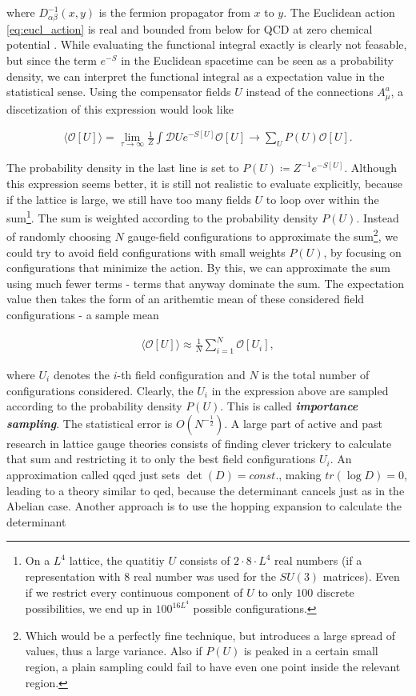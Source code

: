 \documentclass{article}
\theoremstyle{plain} %
\theoremstyle{convention} %
\theoremstyle{remark} %
\def\df#1{\textbf{\textit{#1}}}
\numberwithin{equation}{section}
\begin{document}
where $D_{\alpha \beta}^{-1}(x,y)$ is the fermion propagator from $x$ to $y$. The Euclidean action \eqref{eq:eucl_action} is real and bounded from below for QCD at zero chemical potential \cite{gupta1998}. While evaluating the functional integral exactly is clearly not feasable, but since the term $e^{-S}$ in the Euclidean spacetime can be seen as a probability density, we can interpret the functional integral as a expectation value in the statistical sense. Using the compensator fields $U$ instead of the connections $A_{\mu}^a$, a discetization of this expression would look like

\begin{align*}
    \langle \mathcal{O}[U] \rangle = \lim_{\tau \to \infty} \frac{1}{Z} \int \mathcal{D} U e^{-S[U]} \mathcal{O}[U] \longrightarrow \sum_U P(U) \mathcal{O}[U].
\end{align*}

The probability density in the last line is set to $P(U) \coloneqq Z^{-1} e^{-S[U]}$. Although this expression seems better, it is still not realistic to evaluate explicitly, because if the lattice is large, we still have too many fields $U$ to loop over within the sum\footnote{On a $L^4$ lattice, the quatitiy $U$ consists of $2 \cdot 8 \cdot L^4$ real numbers (if a representation with $8$ real number was used for the $SU(3)$ matrices). Even if we restrict every continuous component of $U$ to only $100$ discrete possibilities, we end up in $100^{16 L^4}$ possible configurations.}. The sum is weighted according to the probability density $P(U)$. Instead of randomly choosing $N$ gauge-field configurations to approximate the sum\footnote{Which would be a perfectly fine technique, but introduces a large spread of values, thus a large variance. Also if $P(U)$ is peaked in a certain small region, a plain sampling could fail to have even one point inside the relevant region.}, we could try to avoid field configurations with small weights $P(U)$, by focusing on configurations that minimize the action. By this, we can approximate the sum using much fewer terms - terms that anyway dominate the sum. The expectation value then takes the form of an arithemtic mean of these considered field configurations - a sample mean

\begin{align}
    \langle \mathcal{O}[U] \rangle \approx \frac{1}{N} \sum_{i=1}^N \mathcal{O}[U_i], \label{eq:sample_mean}
\end{align}

where $U_i$ denotes the $i$-th field configuration and $N$ is the total number of configurations considered. Clearly, the $U_i$ in the expression above are sampled according to the probability density $P(U)$. This is called \df{importance sampling}. The statistical error is $O(N^{-\frac{1}{2}})$. A large part of active and past research in lattice gauge theories consists of finding clever trickery to calculate that sum and restricting it to only the best field configurations $U_i$. An approximation called \acrfull{qqcd} just sets $\det(D) = const.$, making $tr(\log D) = 0$, leading to a theory similar to \acrshort{qed}, because the determinant cancels just as in the Abelian case. Another approach is to use the hopping expansion to calculate the determinant
\end{document}
